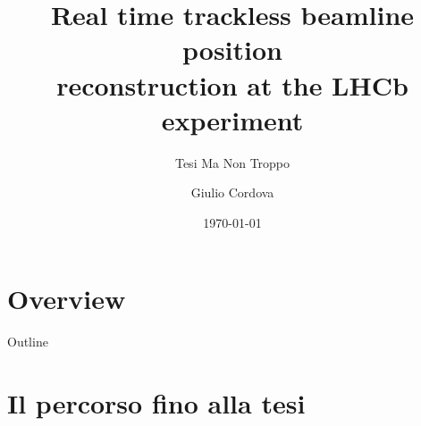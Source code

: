 \documentclass[
10pt,
aspectratio=169,
]{beamer}
\title{Real time trackless beamline position\\ reconstruction at the LHCb experiment }
\subtitle{Tesi Ma Non Troppo}
\author[G.C.]{Giulio Cordova}
\institute[Università di Pisa]{Dipartimento di Fisica E. Fermi\\
Università di Pisa}
\date{\today}
\begin{document}
\maketitle









\section*{Overview}
\begin{frame}[noframenumbering]{Outline}
    \tableofcontents[]{}
\end{frame}
\section{Il percorso fino alla tesi}
\end{document}
